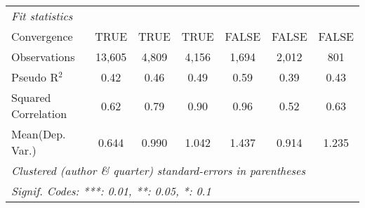 \begin{tabular}{lcccccc}
   \midrule
   \emph{Fit statistics}\\
   Convergence                                                &TRUE            & TRUE         & TRUE         & FALSE       & FALSE         & FALSE\\  
   Observations                                               & 13,605         & 4,809        & 4,156        & 1,694       & 2,012         & 801\\  
   Pseudo R$^2$                                               & 0.42           & 0.46         & 0.49         & 0.59        & 0.39          & 0.43\\  
   Squared Correlation                                        & 0.62           & 0.79         & 0.90         & 0.96        & 0.52          & 0.63\\  
Mean(Dep. Var.) & 0.644 & 0.990 & 1.042 & 1.437 & 0.914 & 1.235 \\
   \midrule \midrule
   \multicolumn{7}{l}{\emph{Clustered (author \& quarter) standard-errors in parentheses}}\\
   \multicolumn{7}{l}{\emph{Signif. Codes: ***: 0.01, **: 0.05, *: 0.1}}\\
\end{tabular}
\par\endgroup
